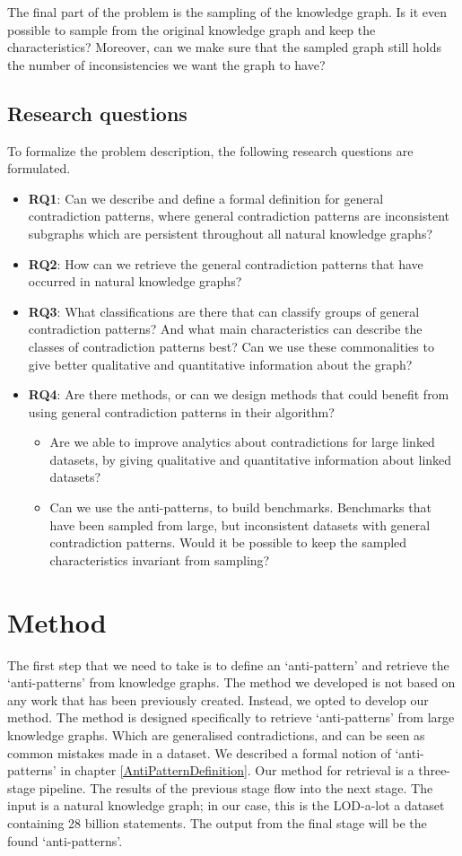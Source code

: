 \documentclass[11pt,letterpaper ,oneside ]{book}
\begin{document}
	The final part of the problem is the sampling of the knowledge graph. Is it even possible to sample from the original knowledge graph and keep the characteristics? Moreover, can we make sure that the sampled graph still holds the number of inconsistencies we want the graph to have? 
	
	\subsection{Research questions}
	To formalize the problem description, the following research questions are formulated.
	\begin{itemize}
		\item \textbf{RQ1}: Can we describe and define a formal definition for general contradiction patterns, where general contradiction patterns are inconsistent subgraphs which are persistent throughout all natural knowledge graphs?
		\item \textbf{RQ2}: How can we retrieve the general contradiction patterns that have occurred in natural knowledge graphs? 
		\item \textbf{RQ3}: What classifications are there that can classify groups of general contradiction patterns? And what main characteristics can describe the classes of contradiction patterns best? Can we use these commonalities to give better qualitative and quantitative information about the graph?
		\item \textbf{RQ4}: Are there methods, or can we design methods that could benefit from using general contradiction patterns in their algorithm? 
		\begin{itemize}
			\item Are we able to improve analytics about contradictions for large linked datasets, by giving qualitative and quantitative information about linked datasets?
			\item Can we use the anti-patterns, to build benchmarks. Benchmarks that have been sampled from large, but inconsistent datasets with general contradiction patterns. Would it be possible to keep the sampled characteristics invariant from sampling?
		\end{itemize}
	\end{itemize}
	
	\section{Method}
	The first step that we need to take is to define an `anti-pattern' and retrieve the `anti-patterns' from knowledge graphs. The method we developed is not based on any work that has been previously created. Instead, we opted to develop our method. The method is designed specifically to retrieve `anti-patterns' from large knowledge graphs. Which are generalised contradictions, and can be seen as common mistakes made in a dataset. We described a formal notion of `anti-patterns' in chapter \ref{AntiPatternDefinition}. Our method for retrieval is a three-stage pipeline. The results of the previous stage flow into the next stage. The input is a natural knowledge graph; in our case, this is the LOD-a-lot\cite{JavierD:2017} a dataset containing 28 billion statements. The output from the final stage will be the found `anti-patterns'. 
	
\end{document}
